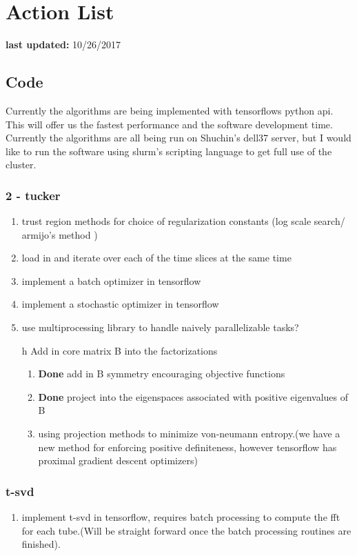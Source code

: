 \documentclass{report}
\begin{document}
\section{Action List}
	\textbf{last updated:} 10/26/2017
	\subsection{Code}
		Currently the algorithms are being implemented with tensorflows python api. This will offer us the fastest performance and the software development time. Currently the algorithms are all being run on Shuchin's dell37 server, but I would like to run the software using slurm's scripting language to get full use of the cluster. 
		\subsubsection{2 - tucker}
			\begin{enumerate}
				\item trust region methods for choice of regularization constants (log scale search/ armijo's method )
				\item load in and iterate over each of the time slices at the same time
				\item implement a batch optimizer in tensorflow
				\item implement a stochastic optimizer in tensorflow
				\item use multiprocessing library to handle naively parallelizable tasks?
				\item[h] Add in core matrix B into the factorizations
				\begin{enumerate}
					\item \textbf{Done} add in B symmetry encouraging objective functions
					\item \textbf{Done} project into the eigenspaces associated with positive eigenvalues of B
					\item using projection methods to minimize von-neumann entropy.(we have a new method for enforcing positive definiteness, however tensorflow has proximal gradient descent optimizers)
				\end{enumerate}
			\end{enumerate}
		\subsubsection{t-svd}
			\begin{enumerate}
				\item implement t-svd in tensorflow, requires batch processing to compute the fft for each tube.(Will be straight forward once the batch processing routines are finished).
			\end{enumerate}
\end{document}
